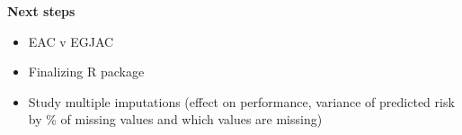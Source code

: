 \documentclass[12pt]{article}
\begin{document}
%                            
%
%                        
%

\textbf{Next steps}
\begin{itemize}
	\item EAC v EGJAC
	\item Finalizing R package
	\item Study multiple imputations (effect on performance, variance of predicted
	risk by \% of missing values and which values are missing)
\end{itemize}
\end{document}

